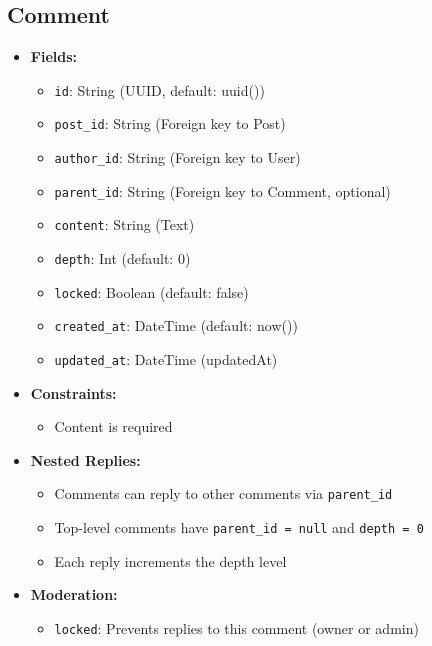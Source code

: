 \documentclass[11pt,a4paper]{article}
\begin{document}
\subsection{Comment}
\begin{itemize}
    \item \textbf{Fields:}
    \begin{itemize}
        \item \texttt{id}: String (UUID, default: uuid())
        \item \texttt{post\_id}: String (Foreign key to Post)
        \item \texttt{author\_id}: String (Foreign key to User)
        \item \texttt{parent\_id}: String (Foreign key to Comment, optional)
        \item \texttt{content}: String (Text)
        \item \texttt{depth}: Int (default: 0)
        \item \texttt{locked}: Boolean (default: false)
        \item \texttt{created\_at}: DateTime (default: now())
        \item \texttt{updated\_at}: DateTime (updatedAt)
    \end{itemize}
    \item \textbf{Constraints:}
    \begin{itemize}
        \item Content is required
    \end{itemize}
    \item \textbf{Nested Replies:}
    \begin{itemize}
        \item Comments can reply to other comments via \texttt{parent\_id}
        \item Top-level comments have \texttt{parent\_id = null} and \texttt{depth = 0}
        \item Each reply increments the depth level
    \end{itemize}
    \item \textbf{Moderation:}
    \begin{itemize}
        \item \texttt{locked}: Prevents replies to this comment (owner or admin)
    \end{itemize}
\end{itemize}
\end{document}
